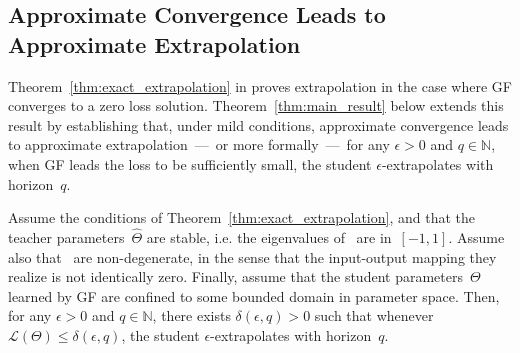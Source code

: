 \subsection{Approximate Convergence Leads to Approximate Extrapolation} \label{sec:approx_extrapolation}

Theorem~\ref{thm:exact_extrapolation} in  proves extrapolation in the case where GF converges to a zero loss solution.
Theorem~\ref{thm:main_result} below extends this result by establishing that, under mild conditions, approximate convergence leads to approximate extrapolation~---~or more formally~---~for any $\epsilon > 0$ and $q \in \mathbb{N}$, when GF leads the loss to be sufficiently small, the student $\epsilon$-extrapolates with horizon~$q$.
\begin{theorem}\label{thm:main_result}
Assume the conditions of Theorem~\ref{thm:exact_extrapolation}, and that the teacher parameters~$\hat{\Theta}$ are stable, i.e. the eigenvalues of~\smash{$\hat{\mA}$} are in~$[-1,1]$.
Assume also that~\smash{$\hat{\Theta}$} are non-degenerate, in the sense that the input-output mapping they realize is not identically zero.
Finally, assume that the student parameters~$\Theta$ learned by GF are confined to some bounded domain in parameter space. 
Then, for any $\epsilon > 0$ and $q \in \mathbb{N}$, there exists $\delta(\epsilon, q) > 0$ such that whenever $\mathcal{L} ( \Theta ) \leq \delta(\epsilon, q)$, the student $\epsilon$-extrapolates with horizon~$q$.
\end{theorem}
